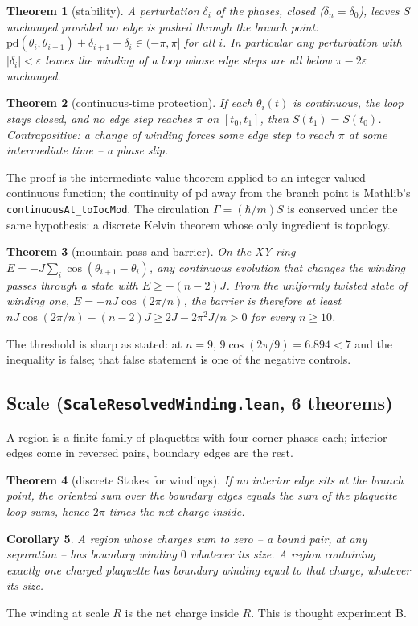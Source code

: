 \documentclass[11pt,a4paper]{article}
\newcommand{\lean}[1]{\texttt{\small #1}}
\newtheorem{theorem}{Theorem}
\newtheorem{corollary}[theorem]{Corollary}
\begin{document}
\begin{theorem}[stability]\label{thm:stability}
A perturbation $\delta_i$ of the phases, closed ($\delta_n=\delta_0$), leaves $S$ unchanged provided
no edge is pushed through the branch point: $\mathrm{pd}(\theta_i,\theta_{i+1})+\delta_{i+1}-\delta_i
\in(-\pi,\pi]$ for all $i$. In particular any perturbation with $|\delta_i|<\varepsilon$ leaves the
winding of a loop whose edge steps are all below $\pi-2\varepsilon$ unchanged.
\end{theorem}

\begin{theorem}[continuous-time protection]\label{thm:conservation}
If each $\theta_i(t)$ is continuous, the loop stays closed, and no edge step reaches $\pi$ on
$[t_0,t_1]$, then $S(t_1)=S(t_0)$. Contrapositive: a change of winding forces some edge step to reach
$\pi$ at some intermediate time -- a phase slip.
\end{theorem}
The proof is the intermediate value theorem applied to an integer-valued continuous function; the
continuity of $\mathrm{pd}$ away from the branch point is Mathlib's
\lean{continuousAt\_toIocMod}. The circulation $\Gamma=(\hbar/m)S$ is conserved under the same
hypothesis: a discrete Kelvin theorem whose only ingredient is topology.

\begin{theorem}[mountain pass and barrier]\label{thm:barrier}
On the XY ring $E=-J\sum_i\cos(\theta_{i+1}-\theta_i)$, any continuous evolution that changes the
winding passes through a state with $E\ge-(n-2)J$. From the uniformly twisted state of winding one,
$E=-nJ\cos(2\pi/n)$, the barrier is therefore at least $nJ\cos(2\pi/n)-(n-2)J\ge 2J-2\pi^2J/n>0$ for
every $n\ge10$.
\end{theorem}
The threshold is sharp as stated: at $n=9$, $9\cos(2\pi/9)=6.894<7$ and the inequality is false; that
false statement is one of the negative controls.

\subsection{Scale (\lean{ScaleResolvedWinding.lean}, 6 theorems)}

A region is a finite family of plaquettes with four corner phases each; interior edges come in
reversed pairs, boundary edges are the rest.

\begin{theorem}[discrete Stokes for windings]\label{thm:stokes}
If no interior edge sits at the branch point, the oriented sum over the boundary edges equals the sum
of the plaquette loop sums, hence $2\pi$ times the net charge inside.
\end{theorem}
\begin{corollary}
A region whose charges sum to zero -- a bound pair, at any separation -- has boundary winding $0$
whatever its size. A region containing exactly one charged plaquette has boundary winding equal to that
charge, whatever its size.
\end{corollary}
The winding at scale $R$ is the net charge inside $R$. This is thought experiment B.
\end{document}
